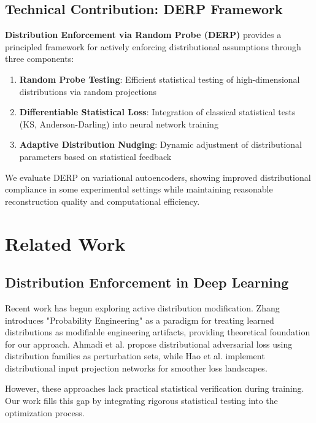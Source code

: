 \documentclass[11pt]{article}
\begin{document}
\subsection{Technical Contribution: DERP Framework}

\textbf{Distribution Enforcement via Random Probe (DERP)} provides a principled framework for actively enforcing distributional assumptions through three components:

\begin{enumerate}
\item \textbf{Random Probe Testing}: Efficient statistical testing of high-dimensional distributions via random projections
\item \textbf{Differentiable Statistical Loss}: Integration of classical statistical tests (KS, Anderson-Darling) into neural network training
\item \textbf{Adaptive Distribution Nudging}: Dynamic adjustment of distributional parameters based on statistical feedback
\end{enumerate}

We evaluate DERP on variational autoencoders, showing improved distributional compliance in some experimental settings while maintaining reasonable reconstruction quality and computational efficiency.

\section{Related Work}

\subsection{Distribution Enforcement in Deep Learning}

Recent work has begun exploring active distribution modification. Zhang \cite{zhang2025advancing} introduces "Probability Engineering" as a paradigm for treating learned distributions as modifiable engineering artifacts, providing theoretical foundation for our approach. Ahmadi et al. \cite{ahmadi2024distributional} propose distributional adversarial loss using distribution families as perturbation sets, while Hao et al. \cite{hao2025towards} implement distributional input projection networks for smoother loss landscapes.

However, these approaches lack practical statistical verification during training. Our work fills this gap by integrating rigorous statistical testing into the optimization process.
\end{document}
